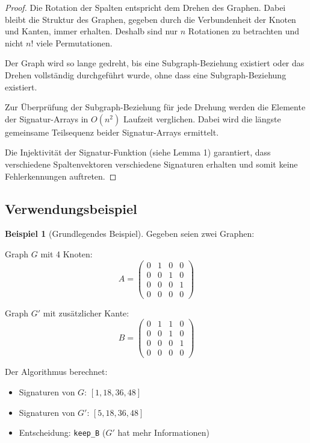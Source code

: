 \documentclass[a4paper,12pt]{article}
\theoremstyle{definition}
\newtheorem{beispiel}{Beispiel}
\begin{document}
\begin{proof}
	Die Rotation der Spalten entspricht dem Drehen des Graphen. Dabei bleibt die Struktur des Graphen, gegeben durch die Verbundenheit der Knoten und Kanten, immer erhalten. Deshalb sind nur $n$ Rotationen zu betrachten und nicht $n!$ viele Permutationen.
	
	Der Graph wird so lange gedreht, bis eine Subgraph-Beziehung existiert oder das Drehen vollständig durchgeführt wurde, ohne dass eine Subgraph-Beziehung existiert.
	
	Zur Überprüfung der Subgraph-Beziehung für jede Drehung werden die Elemente der Signatur-Arrays in $O(n^2)$ Laufzeit verglichen. Dabei wird die längste gemeinsame Teilsequenz beider Signatur-Arrays ermittelt.
	
	Die Injektivität der Signatur-Funktion (siehe Lemma 1) garantiert, dass verschiedene Spaltenvektoren verschiedene Signaturen erhalten und somit keine Fehlerkennungen auftreten.
\end{proof}

\subsection{Verwendungsbeispiel}

\begin{beispiel}[Grundlegendes Beispiel]
	Gegeben seien zwei Graphen:
	
	Graph $G$ mit 4 Knoten:
	\[
	A = \begin{pmatrix}
		0 & 1 & 0 & 0 \\
		0 & 0 & 1 & 0 \\
		0 & 0 & 0 & 1 \\
		0 & 0 & 0 & 0
	\end{pmatrix}
	\]
	
	Graph $G'$ mit zusätzlicher Kante:
	\[
	B = \begin{pmatrix}
		0 & 1 & 1 & 0 \\
		0 & 0 & 1 & 0 \\
		0 & 0 & 0 & 1 \\
		0 & 0 & 0 & 0
	\end{pmatrix}
	\]
	
	Der Algorithmus berechnet:
	\begin{itemize}
		\item Signaturen von $G$: $[1, 18, 36, 48]$
		\item Signaturen von $G'$: $[5, 18, 36, 48]$
		\item Entscheidung: \texttt{keep\_B} ($G'$ hat mehr Informationen)
	\end{itemize}
\end{beispiel}
\end{document}
